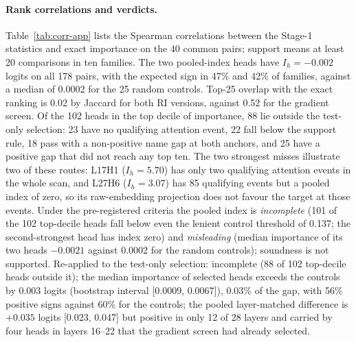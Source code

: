 \paragraph{Rank correlations and verdicts.}
Table~\ref{tab:corr-app} lists the Spearman correlations between the Stage-1
statistics and exact importance on the 40 common pairs; support means at least 20
comparisons in ten families. The two pooled-index heads have $I_h=-0.002$ logits on
all 178 pairs, with the expected sign in 47\% and 42\% of families, against a median
of 0.0002 for the 25 random controls. Top-25 overlap with the exact ranking is 0.02
by Jaccard for both RI versions, against 0.52 for the gradient screen. Of the 102
heads in the top decile of importance, 88 lie outside the test-only selection: 23
have no qualifying attention event, 22 fall below the support rule, 18 pass with a
non-positive name gap at both anchors, and 25 have a positive gap that did not reach
any top ten. The two strongest misses illustrate two of these routes: L17H1
($I_h=5.70$) has only two qualifying attention events in the whole scan, and L27H6
($I_h=3.07$) has 85 qualifying events but a pooled index of zero, so its
raw-embedding projection does not favour the target at those events. Under the pre-registered criteria the pooled index is
\emph{incomplete} (101 of the 102 top-decile heads fall below even the lenient
control threshold of 0.137; the second-strongest head has index zero) and
\emph{misleading} (median importance of its two heads $-0.0021$ against 0.0002 for
the random controls); soundness is not supported. Re-applied to the test-only
selection: incomplete (88 of 102 top-decile heads outside it); the median importance
of selected heads exceeds the controls by 0.003 logits (bootstrap interval
[0.0009, 0.0067]), 0.03\% of the gap, with 56\% positive signs against 60\% for the
controls; the pooled layer-matched difference is $+0.035$ logits [0.023, 0.047] but
positive in only 12 of 28 layers and carried by four heads in layers 16--22 that the
gradient screen had already selected.


